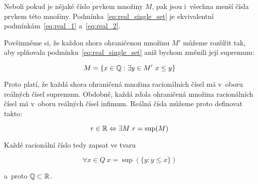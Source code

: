 Neboli pokud je nějaké číslo prvkem množiny \(M\), pak jsou i~všechna menší čísla prvkem této množiny. Podmínka~\eqref{eq:real_single_set} je ekvivalentní podmínkám~\eqref{eq:real_1} a~\eqref{eq:real_2}.

Povšimněme si, že každou shora ohraničenou množinu \(M'\) můžeme rozšířit tak, aby splňovala podmínku~\eqref{eq:real_single_set} aniž bychom změnili její supremum:

\begin{equation}
M = \{x \in \mathbb{Q}: \exists y \in M' \ x \leq y\} 
\end{equation}

Proto platí, že každá shora ohraničená množina racionálních čísel má v~oboru reálných čísel supremum. Obdobně, každá zdola ohraničená množina racionálních čísel má v~oboru reálných čísel infimum. Reálná čísla můžeme proto definovat takto:

\begin{fact}
\begin{equation}
r \in \mathbb{R} \Leftrightarrow \exists M \ r = \sup(M)
\end{equation}
\end{fact}

Každé racionální číslo tedy zapsat ve tvaru

\begin{equation}
\forall x \in Q \ x = \sup(\{y: y \leq x\})
\end{equation}

a~proto \(\mathbb{Q} \subset \mathbb{R}\).


